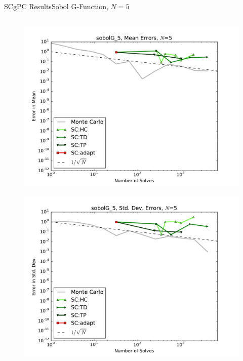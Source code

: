 \documentclass{beamer}
\begin{document}
\begin{frame}{SCgPC Results}{Sobol G-Function, $N=5$}
\begin{columns}
\begin{column}{0.5\textwidth}
\begin{figure}[h!]
          \includegraphics[width=0.8\linewidth]{anlmodels/sobolG_5_mean_errs_nohdmr}
        \end{figure}
        \vspace{-20pt}
        \begin{figure}[h!]
          \centering
          \includegraphics[width=0.8\linewidth]{anlmodels/sobolG_5_variance_errs_nohdmr}
        \end{figure}
   \end{column}
 \end{columns}
\end{frame}
\end{document}
